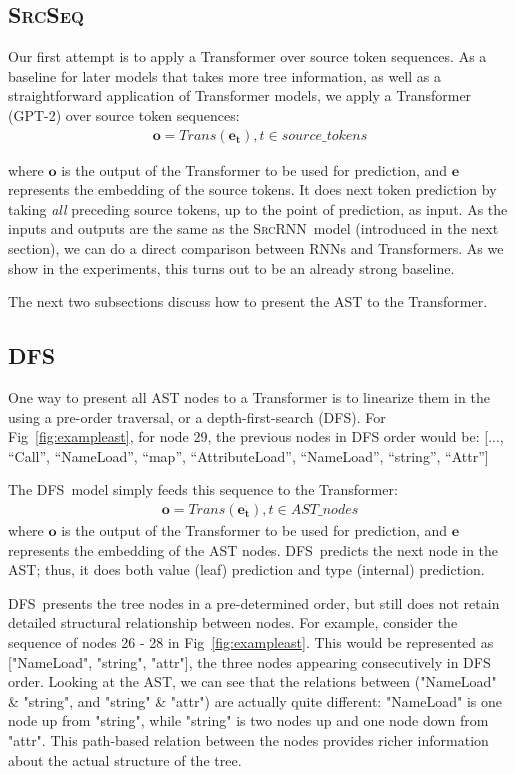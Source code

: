 \documentclass[nonacm, sigconf]{acmart}
\renewcommand{\vec}[1]{\boldsymbol{#1}}
\newcommand{\abbr}[1]{\textsc{#1}~}
\newcommand{\SrcSeq}{\abbr{SrcSeq}} \newcommand{\SrcRNN}{\abbr{SrcRNN}} \newcommand{\LeafSeq}{\abbr{LeafSeq}} \newcommand{\RootPath}{\abbr{RootPath}} \newcommand{\LeafTokens}{\abbr{LeafTokens}} \newcommand{\DFS}{\abbr{DFS}} \newcommand{\TreeRel}{\abbr{DFS{ud}}} \newcommand{\TreeReli}{\abbr{DFS{ud+}}}
\newcommand{\figref}[1]{Fig~\ref{#1}}
\begin{document}
\subsection{\SrcSeq}
Our first attempt is to apply a Transformer over source token sequences.
As a baseline for later models that takes more tree information, as well as a straightforward application of Transformer models, we apply a Transformer (GPT-2) over source token sequences:
\begin{align*}
    \vec{o} = Trans(\vec{e_{t}}), t\in \mathit{source\_tokens}
\end{align*}

where $\vec{o}$ is the output of the Transformer to be used for prediction, and $\vec{e}$ represents the embedding of the source tokens.
It does next token prediction by taking \textit{all} preceding source tokens, up to the point of prediction, as input. As the inputs and outputs are the same as the \SrcRNN model (introduced in the next section), we can do a direct comparison between RNNs and Transformers.
As we show in the experiments, this turns out to be an already strong baseline.

The next two subsections discuss how to present the AST to the Transformer.

\subsection{\DFS}
One way to present all AST nodes to a Transformer is to linearize them in the using a pre-order traversal, or a depth-first-search (DFS). For Fig~\ref{fig:exampleast}, for node 29, the previous nodes in DFS order would be:
[..., ``Call'', ``NameLoad'', ``map'', ``AttributeLoad'', ``NameLoad'', ``string'', ``Attr'']

The \DFS model simply feeds this sequence to the Transformer:
\begin{align*}
    \vec{o} = Trans(\vec{e_{t}}), t\in \mathit{AST\_nodes}
\end{align*}
where $\vec{o}$ is the output of the Transformer to be used for prediction, and $\vec{e}$ represents the embedding of the AST nodes.
\DFS predicts the next node in the AST; thus, it does both value (leaf) prediction and type (internal) prediction. 

\DFS presents the tree nodes in a pre-determined order, but still does not retain detailed structural relationship between nodes.
For example, consider the sequence of nodes 26 - 28 in \figref{fig:exampleast}. This would be represented as ["NameLoad", "string", "attr"], the three nodes appearing consecutively in DFS order. Looking at the AST, we can see that the relations between ("NameLoad" \& "string", and "string" \& "attr") are actually quite different: "NameLoad" is one node up from "string", while "string" is two nodes up and one node down from "attr". This path-based relation between the nodes provides richer information about the actual structure of the tree.
\end{document}
